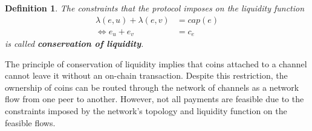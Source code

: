 \documentclass[10pt,twocolumn]{article}
\newtheorem{definition}{Definition}[section]
\begin{document}
\begin{definition}
  The constraints that the protocol imposes on the liquidity function
\begin{equation}
  \label{eq:conservationOfLiquidity}
  \begin{split}
  \lambda(e,u) + \lambda(e,v) & = cap(e) \\
  \Leftrightarrow e_u + e_v & = c_e
  \end{split}
\end{equation}
is called \textbf{conservation of liquidity}.
\end{definition}




The principle of conservation of liquidity implies that coins attached to a channel cannot leave it without an on-chain transaction.
Despite this restriction, the ownership of coins can be routed through the network of channels as a network flow from one peer to another.
However, not all payments are feasible due to the constraints imposed by the network's topology and liquidity function on the feasible flows.
\end{document}
